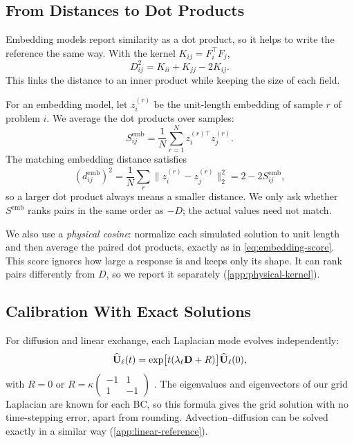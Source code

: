 \subsection{From Distances to Dot Products}
Embedding models report similarity as a dot product, so it helps to write the reference the same way. With the kernel $K_{ij}=F_i^\top F_j$,
\begin{equation}
 D_{ij}^2=K_{ii}+K_{jj}-2K_{ij}.
\label{eq:raw-kernel}
\end{equation}
This links the distance to an inner product while keeping the size of each field.

For an embedding model, let $z_i^{(r)}$ be the unit-length embedding of sample $r$ of problem $i$. We average the dot products over samples:
\begin{equation}
 S_{ij}^{\mathrm{emb}}=
 \frac1N\sum_{r=1}^{N}z_i^{(r)\top}z_j^{(r)}.
\label{eq:embedding-score}
\end{equation}
The matching embedding distance satisfies
\begin{equation}
 (d_{ij}^{\mathrm{emb}})^2
 =\frac1N\sum_r\|z_i^{(r)}-z_j^{(r)}\|_2^2
 =2-2S_{ij}^{\mathrm{emb}},
\label{eq:chord}
\end{equation}
so a larger dot product always means a smaller distance. We only ask whether $S^{\mathrm{emb}}$ ranks pairs in the same order as $-D$; the actual values need not match.

We also use a \emph{physical cosine}: normalize each simulated solution to unit length and then average the paired dot products, exactly as in \cref{eq:embedding-score}. This score ignores how large a response is and keeps only its shape. It can rank pairs differently from $D$, so we report it separately (\cref{app:physical-kernel}).

\subsection{Calibration With Exact Solutions}
For diffusion and linear exchange, each Laplacian mode evolves independently:
\begin{equation}
 \widehat{\mathbf U}_\ell(t)
 =\exp\!\big[t(\lambda_\ell\mathbf D+R)\big]
 \widehat{\mathbf U}_\ell(0),
\label{eq:linear-reference}
\end{equation}
with $R=0$ or $R=\kappa\left(\begin{smallmatrix}-1&1\\1&-1\end{smallmatrix}\right)$ \citep{higham2008functions}. The eigenvalues and eigenvectors of our grid Laplacian are known for each BC, so this formula gives the grid solution with no time-stepping error, apart from rounding. Advection--diffusion can be solved exactly in a similar way (\cref{app:linear-reference}).

